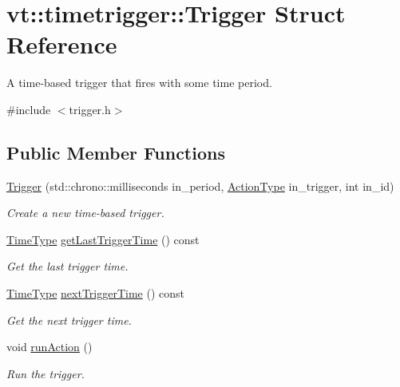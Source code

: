 \hypertarget{structvt_1_1timetrigger_1_1_trigger}{}\section{vt\+:\+:timetrigger\+:\+:Trigger Struct Reference}
\label{structvt_1_1timetrigger_1_1_trigger}


A time-\/based trigger that fires with some time period.  




{\ttfamily \#include $<$trigger.\+h$>$}

\subsection*{Public Member Functions}
\begin{DoxyCompactItemize}
\item 
\hyperlink{structvt_1_1timetrigger_1_1_trigger_aa457c370c31674979005504c703e2df4}{Trigger} (std\+::chrono\+::milliseconds in\+\_\+period, \hyperlink{namespacevt_ae0a5a7b18cc99d7b732cb4d44f46b0f3}{Action\+Type} in\+\_\+trigger, int in\+\_\+id)
\begin{DoxyCompactList}\small\item\em Create a new time-\/based trigger. \end{DoxyCompactList}\item 
\hyperlink{namespacevt_a876a9d0cd5a952859c72de8a46881442}{Time\+Type} \hyperlink{structvt_1_1timetrigger_1_1_trigger_a4065ece0b3f17ee3780b045e3520aaf5}{get\+Last\+Trigger\+Time} () const
\begin{DoxyCompactList}\small\item\em Get the last trigger time. \end{DoxyCompactList}\item 
\hyperlink{namespacevt_a876a9d0cd5a952859c72de8a46881442}{Time\+Type} \hyperlink{structvt_1_1timetrigger_1_1_trigger_a77c78026bc618f6084ecda2a3e0198ba}{next\+Trigger\+Time} () const
\begin{DoxyCompactList}\small\item\em Get the next trigger time. \end{DoxyCompactList}\item 
void \hyperlink{structvt_1_1timetrigger_1_1_trigger_a29a10a659bf04e07cc0ced93bc7271e2}{run\+Action} ()
\begin{DoxyCompactList}\small\item\em Run the trigger. \end{DoxyCompactList}\item 

\end{DoxyCompactItemize}
